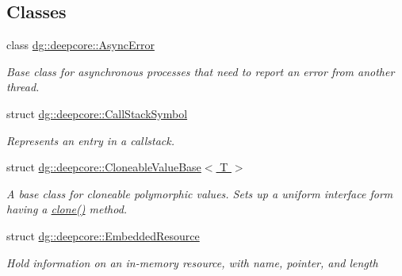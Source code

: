 \subsection*{Classes}
\begin{DoxyCompactItemize}
\item 
class \hyperlink{classdg_1_1deepcore_1_1_async_error}{dg\+::deepcore\+::\+Async\+Error}
\begin{DoxyCompactList}\small\item\em Base class for asynchronous processes that need to report an error from another thread. \end{DoxyCompactList}\item 
struct \hyperlink{structdg_1_1deepcore_1_1_call_stack_symbol}{dg\+::deepcore\+::\+Call\+Stack\+Symbol}
\begin{DoxyCompactList}\small\item\em Represents an entry in a callstack. \end{DoxyCompactList}\item 
struct \hyperlink{structdg_1_1deepcore_1_1_cloneable_value_base}{dg\+::deepcore\+::\+Cloneable\+Value\+Base$<$ T $>$}
\begin{DoxyCompactList}\small\item\em A base class for cloneable polymorphic values. Sets up a uniform interface form having a {\ttfamily \hyperlink{structdg_1_1deepcore_1_1_cloneable_value_base_afa66af64c1335e01931f7919f0033730}{clone()}} method. \end{DoxyCompactList}\item 
struct \hyperlink{structdg_1_1deepcore_1_1_embedded_resource}{dg\+::deepcore\+::\+Embedded\+Resource}
\begin{DoxyCompactList}\small\item\em Hold information on an in-\/memory resource, with name, pointer, and length


\end{DoxyCompactList}
\end{DoxyCompactItemize}
